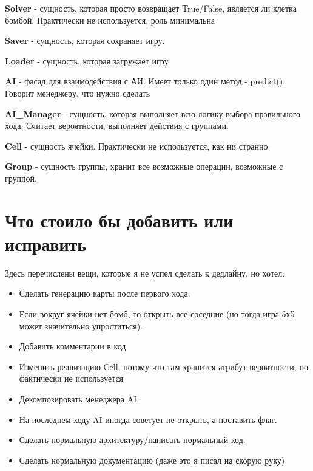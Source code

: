 \documentclass[a4paper,14pt, unknownkeysallowed]{extreport}
\begin{document}
\textbf{Solver} - сущность, которая просто возвращает True/False, является ли клетка бомбой. Практически не используется, роль минимальна

\textbf{Saver} - сущность, которая сохраняет игру.

\textbf{Loader} - сущность, которая загружает игру

\textbf{AI} - фасад для взаимодействия с АИ. Имеет только один метод - predict(). Говорит менеджеру, что нужно сделать

\textbf{AI\_Manager} - сущность, которая выполняет всю логику выбора правильного хода. Считает вероятности, выполняет действия с группами.

\textbf{Cell} - сущность ячейки. Практически не используется, как ни странно

\textbf{Group} - сущность группы, хранит все возможные операции, возможные с группой.

\chapter{Что стоило бы добавить или исправить}
Здесь перечислены вещи, которые я не успел сделать к дедлайну, но хотел:
\begin{itemize}
	\item Сделать генерацию карты после первого хода.
	\item Если вокруг ячейки нет бомб, то открыть все соседние (но тогда игра 5х5 может значительно упроститься).
	\item Добавить комментарии в код
	\item Изменить реализацию Cell, потому что там хранится атрибут вероятности, но фактически не используется
	\item Декомпозировать менеджера AI.
	\item На последнем ходу AI иногда советует не открыть, а поставить флаг.
	\item Сделать нормальную архитектуру/написать нормальный код.
	\item Сделать нормальную документацию (даже это я писал на скорую руку)
\end{itemize}
\end{document}
